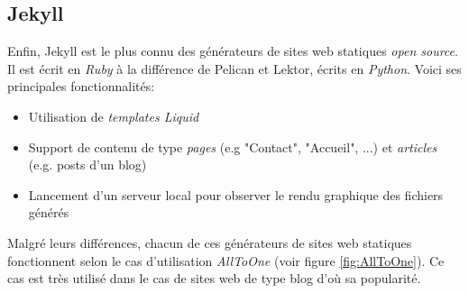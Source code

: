 	\subsection*{Jekyll}
	Enfin, Jekyll \cite{Jekyll} est le plus connu des générateurs de sites web statiques \textit{open source}. Il est écrit en \textit{Ruby} à la différence de Pelican et Lektor, écrits en \textit{Python}. Voici ses principales fonctionnalités:
	
	\begin{itemize}
		\item Utilisation de \textit{templates Liquid}
		\item Support de contenu de type \textit{pages} (e.g "Contact", "Accueil", ...) et \textit{articles} (e.g. posts d'un blog)
		\item Lancement d'un serveur local pour observer le rendu graphique des fichiers générés\\
	\end{itemize}
	
	Malgré leurs différences, chacun de ces générateurs de sites web statiques fonctionnent selon le cas d'utilisation \textit{AllToOne} (voir figure \ref{fig:AllToOne}). Ce cas est très utilisé dans le cas de sites web de type blog d'où sa popularité.